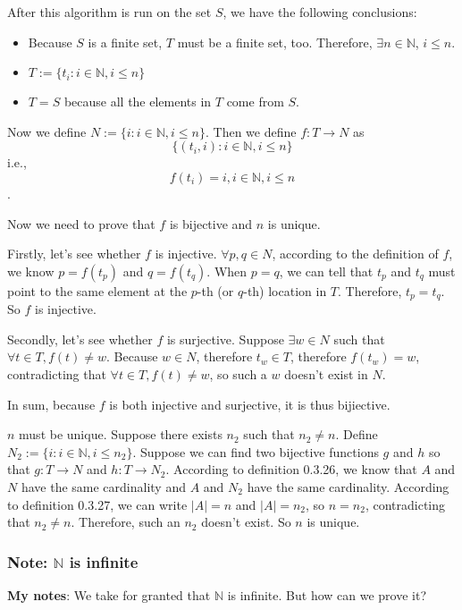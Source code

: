 \documentclass[12pt, letterpaper, oneside]{book}
\begin{document}
After this algorithm is run on the set $S$, we have the following conclusions:
\begin{itemize}
  \item Because $S$ is a finite set, $T$ must be a finite set, too. Therefore,
    $\exists n \in \mathbb{N}$, $i \leq n$.
  \item $T:= \{t_i: i \in \mathbb{N}, i \leq n \}$
  \item $T = S$ because all the elements in $T$ come from $S$.
\end{itemize}

Now we define $N := \{i: i \in \mathbb{N}, i \leq n\}$. Then we define
$f: T \rightarrow N$ as \[\{(t_i, i): i \in \mathbb{N}, i \leq n\}\] i.e., \[
f(t_i) = i, i \in \mathbb{N}, i \leq n\].

Now we need to prove that $f$ is bijective and $n$ is unique.

Firstly, let's see whether $f$ is injective. $\forall p, q \in N$, according to
the definition of $f$, we know $p = f(t_p)$ and $q = f(t_q)$. When $p = q$, we
can tell that $t_p$ and $t_q$ must point to the same element at the $p$-th (or
$q$-th) location in $T$. Therefore, $t_p = t_q$. So $f$ is injective.

Secondly, let's see whether $f$ is surjective. Suppose $\exists w \in N$ such
that $\forall t \in T, f(t) \neq w$. Because $w \in N$, therefore $t_w \in T$,
therefore $f(t_w) = w$, contradicting that $\forall t \in T, f(t) \neq w$, so
such a $w$ doesn't exist in $N$.

In sum, because $f$ is both injective and surjective, it is thus bijiective.

$n$ must be unique. Suppose there exists $n_2$ such that $n_2 \neq n$.
Define $N_2:= \{i: i \in \mathbb{N}, i \leq n_2\}$. Suppose we can find two
bijective functions $g$ and $h$ so that $g: T \rightarrow N$ and $h: T
\rightarrow N_2$. According to definition 0.3.26, we know that $A$ and $N$ have
the same cardinality and $A$ and $N_2$ have the same cardinality. According to
definition 0.3.27, we can write $|A| = n$ and $|A| = n_2$, so $n = n_2$,
contradicting that $n_2 \neq n$. Therefore, such an $n_2$ doesn't exist. So $n$
is unique.

\subsubsection{Note: $\mathbb{N}$ is infinite}

\colorbox{lime!100}{\textbf{My notes}}: We take for granted that $\mathbb{N}$
is infinite. But how can we prove it?
\end{document}
